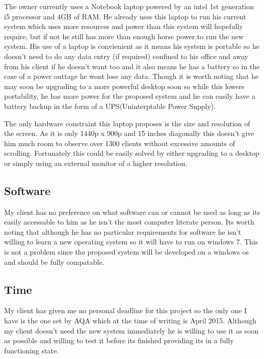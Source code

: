 The owner currently uses a Notebook laptop powered by an intel 1st generation i5 processor and 4GB of RAM. He already uses this laptop to run his current system which uses more resources and power than this system will hopefully require, but if not he still has more than enough horse power to run the new system. His use of a laptop is convienient as it means his system is portable so he doesn't need to do any data entry (if required) confined to his office and away from his client if he doesn't want too and it also means he has a battery so in the case of a power outtage he wont lose any data. Though it is worth noting that he may soon be upgrading to a more powerful desktop soon so while this lowers portability, he has more power for the proposed system and he can easily have a battery backup in the form of a UPS(Uninterptable Power Supply).

The only hardware constraint this laptop proposes is the size and resolution of the screen. As it is only 1440p x 900p and 15 inches diagonally this doesn't give him much room to observe over 1300 clients without excessive amounts of scrolling. Fortunately this could be easily solved by either upgrading to a desktop or simply using an external monitor of a higher resolution.

\subsection{Software}

My client has no preference on what software can or cannot be used as long as its easily accessable to him as he isn't the most computer literate person. Its worth noting that although he has no particular requirements for software he isn't willing to learn a new operating system so it will have to run on windows 7. This is not a problem since the proposed system will be developed on a windows os and should be fully compatable.

\subsection{Time}

My client has given me no personal deadline for this project so the only one I have is the one set by AQA which at the time of writing is April 2015. Although my client doesn't need the new system immediately he is willing to use it as soon as possible and willing to test it before its finished providing its in a fully functioning state.

